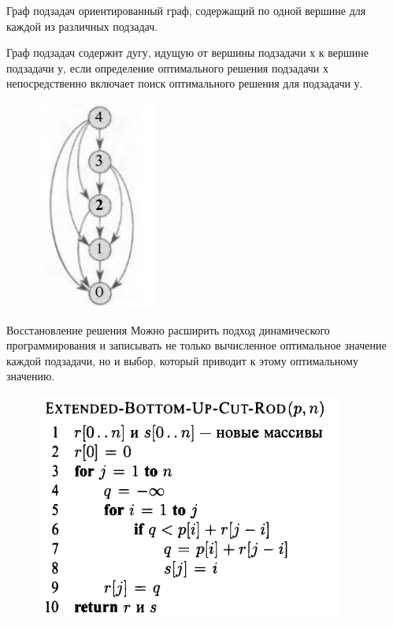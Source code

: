 \documentclass{beamer}
\begin{document}
\begin{frame}[t]
    \begin{block}{Граф подзадач}
        ориентированный граф, содержащий по одной вершине для каждой из различных подзадач.
    \end{block}
    Граф подзадач содержит дугу, идущую от вершины подзадачи х к вершине подзадачи у, если определение оптимального решения подзадачи х непосредственно включает поиск оптимального решения для подзадачи у.   
   \begin{figure}[h]
		\centering
		\includegraphics[scale=0.6]{images/lec09-pic08.png}
	\end{figure}
\end{frame}

\begin{frame}[t]{Восстановление решения}
    Можно расширить подход динамического программирования и записывать не только вычисленное оптимальное значение каждой подзадачи, но и выбор, который приводит к этому оптимальному значению. 
    \begin{figure}[h]
		\centering
		\includegraphics[scale=0.6]{images/lec09-pic09.png}
	\end{figure}
\end{frame}
\end{document}
